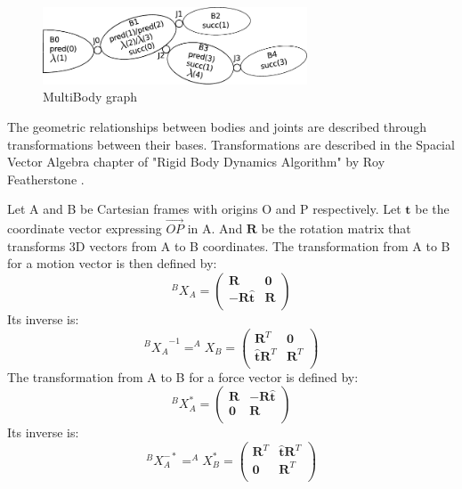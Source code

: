 \begin{figure}
  \centering
  \includegraphics[width=0.7\textwidth]{mbg.pdf}
  \caption{MultiBody graph}
  \label{fig:mbg}
\end{figure}

The geometric relationships between bodies and joints are described through transformations between their bases. Transformations are described in the Spacial Vector Algebra chapter of "Rigid Body Dynamics Algorithm" by Roy Featherstone \cite{featherstone:book:2007}.

Let A and B be Cartesian frames with origins O and P respectively. Let $\mathbf{t}$ be the coordinate vector expressing $\overrightarrow{OP}$ in A. And $\mathbf{R}$ be the rotation matrix that transforms 3D vectors from A to B coordinates.
The transformation from A to B for a motion vector is then defined by:
\begin{equation}
  ^BX_A =
  \begin{pmatrix}
    \mathbf{R} & \mathbf{0} \\
    -\mathbf{R}\hat{\mathbf{t}} & \mathbf{R} \\
  \end{pmatrix}
\end{equation}
Its inverse is:
\begin{equation}
  {^BX_A}^{-1} = ^AX_B =
  \begin{pmatrix}
    \mathbf{R}^T & \mathbf{0} \\
    \hat{\mathbf{t}}\mathbf{R}^T & \mathbf{R}^T \\
  \end{pmatrix}
\end{equation}
The transformation from A to B for a force vector is defined by:
\begin{equation}
  ^BX_A^* =
  \begin{pmatrix}
    \mathbf{R} & -\mathbf{R}\hat{\mathbf{t}} \\
    \mathbf{0} & \mathbf{R} \\
  \end{pmatrix}
\end{equation}
Its inverse is:
\begin{equation}
  ^BX_A^{-*} = ^AX_B^* =
  \begin{pmatrix}
    \mathbf{R}^T & \hat{\mathbf{t}}\mathbf{R}^T \\
    \mathbf{0} & \mathbf{R}^T \\
  \end{pmatrix}
\end{equation}

